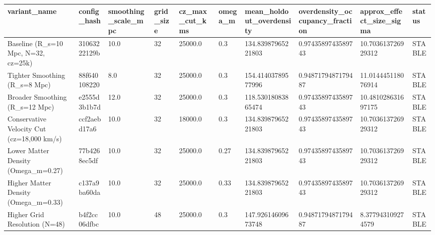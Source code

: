 \begin{tabular}{llllllllll}
\hline
variant_name & config_hash & smoothing_scale_mpc & grid_size & cz_max_cut_kms & omega_m & mean_holdout_overdensity & overdensity_occupancy_fraction & approx_effect_size_sigma & status \\
\hline
Baseline (R\_s=10 Mpc, N=32, cz=25k) & 31063222129b & 10.0 & 32 & 25000.0 & 0.3 & 134.83987965221803 & 0.9743589743589743 & 10.703613726929312 & STABLE \\
Tighter Smoothing (R\_s=8 Mpc) & 88f640108220 & 8.0 & 32 & 25000.0 & 0.3 & 154.41403789577996 & 0.9487179487179487 & 11.014445118076914 & STABLE \\
Broader Smoothing (R\_s=12 Mpc) & e2555d3b1b7d & 12.0 & 32 & 25000.0 & 0.3 & 118.53018083865474 & 0.9743589743589743 & 10.481028631697175 & STABLE \\
Conservative Velocity Cut (cz=18,000 km/s) & ccf2aebd17a6 & 10.0 & 32 & 18000.0 & 0.3 & 134.83987965221803 & 0.9743589743589743 & 10.703613726929312 & STABLE \\
Lower Matter Density (Omega\_m=0.27) & 77b4268ec5df & 10.0 & 32 & 25000.0 & 0.27 & 134.83987965221803 & 0.9743589743589743 & 10.703613726929312 & STABLE \\
Higher Matter Density (Omega\_m=0.33) & c137a9ba60da & 10.0 & 32 & 25000.0 & 0.33 & 134.83987965221803 & 0.9743589743589743 & 10.703613726929312 & STABLE \\
Higher Grid Resolution (N=48) & b4f2cc06dfbc & 10.0 & 48 & 25000.0 & 0.3 & 147.92614609673748 & 0.9487179487179487 & 8.377943109274579 & STABLE \\
\hline
\end{tabular}
